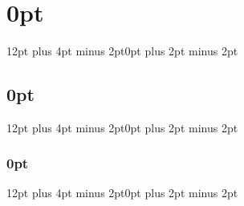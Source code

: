     \graphicspath{ {img/} }

    
    \newpage~




    \renewcommand{\arraystretch}{1.5}

    \setlength{\parskip}{1em}
    \setlength{\parindent}{0pt}

    \titlespacing\section{0pt}{12pt plus 4pt minus 2pt}{0pt plus 2pt minus 2pt}
    \titlespacing\subsection{0pt}{12pt plus 4pt minus 2pt}{0pt plus 2pt minus 2pt}
    \titlespacing\subsubsection{0pt}{12pt plus 4pt minus 2pt}{0pt plus 2pt minus 2pt}


    ~
    \thispagestyle{empty}
    \setcounter{page}{0}
    \newpage

	 \newpage

     \newpage

     \newpage

     \newpage

     \newpage
